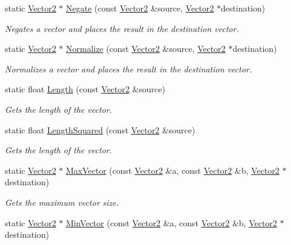 \begin{DoxyCompactItemize}
static \hyperlink{class_flounder_1_1_vector2}{Vector2} $\ast$ \hyperlink{class_flounder_1_1_vector2_ae301982451eb7095a91557edf5175fa0}{Negate} (const \hyperlink{class_flounder_1_1_vector2}{Vector2} \&source, \hyperlink{class_flounder_1_1_vector2}{Vector2} $\ast$destination)
\begin{DoxyCompactList}\small\item\em Negates a vector and places the result in the destination vector. \end{DoxyCompactList}\item 
static \hyperlink{class_flounder_1_1_vector2}{Vector2} $\ast$ \hyperlink{class_flounder_1_1_vector2_ab95dd4cfef120743c76e7f727966fbe2}{Normalize} (const \hyperlink{class_flounder_1_1_vector2}{Vector2} \&source, \hyperlink{class_flounder_1_1_vector2}{Vector2} $\ast$destination)
\begin{DoxyCompactList}\small\item\em Normalizes a vector and places the result in the destination vector. \end{DoxyCompactList}\item 
static float \hyperlink{class_flounder_1_1_vector2_a9ebb261ecbf3834b8cb7f68290e22e36}{Length} (const \hyperlink{class_flounder_1_1_vector2}{Vector2} \&source)
\begin{DoxyCompactList}\small\item\em Gets the length of the vector. \end{DoxyCompactList}\item 
static float \hyperlink{class_flounder_1_1_vector2_a68d558537c1e85769d71f3fd2084880e}{Length\+Squared} (const \hyperlink{class_flounder_1_1_vector2}{Vector2} \&source)
\begin{DoxyCompactList}\small\item\em Gets the length of the vector. \end{DoxyCompactList}\item 
static \hyperlink{class_flounder_1_1_vector2}{Vector2} $\ast$ \hyperlink{class_flounder_1_1_vector2_ae336239a9da7f694c20d427e4a8074c7}{Max\+Vector} (const \hyperlink{class_flounder_1_1_vector2}{Vector2} \&a, const \hyperlink{class_flounder_1_1_vector2}{Vector2} \&b, \hyperlink{class_flounder_1_1_vector2}{Vector2} $\ast$destination)
\begin{DoxyCompactList}\small\item\em Gets the maximum vector size. \end{DoxyCompactList}\item 
static \hyperlink{class_flounder_1_1_vector2}{Vector2} $\ast$ \hyperlink{class_flounder_1_1_vector2_ad3ad00234085adc307188a85fc7cbad0}{Min\+Vector} (const \hyperlink{class_flounder_1_1_vector2}{Vector2} \&a, const \hyperlink{class_flounder_1_1_vector2}{Vector2} \&b, \hyperlink{class_flounder_1_1_vector2}{Vector2} $\ast$destination)

\end{DoxyCompactItemize}

